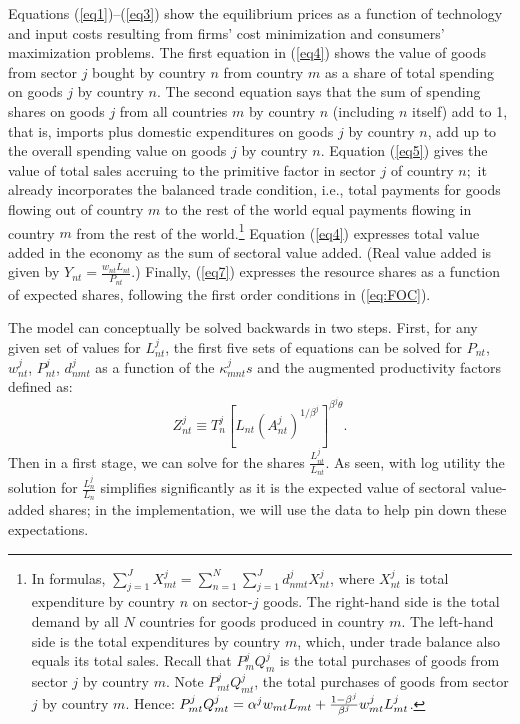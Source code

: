 \documentclass[12pt]{article}
\begin{document}
Equations (\ref{eq1})--(\ref{eq3}) show the equilibrium prices as a function
of technology and input costs resulting from firms' cost minimization and
consumers' maximization problems. The first equation in (\ref{eq4}) shows
the value of goods from sector $j$ bought by country $n$ from country $m$ as
a share of total spending on goods $j$ by country $n.$ The second equation
says that the sum of spending shares on goods $j$ from all countries $m$ by
country $n$ (including $n$ itself) add to 1, that is, imports plus domestic
expenditures on goods $j$ by country $n$, add up to the overall spending
value on goods $j$ by country $n.$ Equation (\ref{eq5}) gives the value of
total sales accruing to the primitive factor in sector $j$ of country $n;$
it already incorporates the balanced trade condition, i.e., total payments
for goods flowing out of country $m$ to the rest of the world equal payments
flowing in country $m$ from the rest of the world.\footnote{%
In formulas, $\sum\nolimits_{j=1}^{J}X_{mt}^{j}=\sum\nolimits_{n=1}^{N}\sum%
\nolimits_{j=1}^{J}d_{nmt}^{j}X_{nt}^{j}$, where $X_{nt}^{j}$ is total
expenditure by country $n$ on sector-$j$ goods. The right-hand side is the
total demand by all $N$ countries for goods produced in country $m$. The
left-hand side is the total expenditures by country $m$, which, under trade
balance also equals its total sales. Recall that $P_{m}^{j}Q_{m}^{j}$ is the
total purchases of goods from sector $j$ by country $m.$ Note $%
P_{mt}^{j}Q_{mt}^{j}$, the total purchases of goods from sector $j$ by
country $m.$ Hence: $P_{mt}^{j}Q_{mt}^{j}=\alpha ^{j}w_{mt}L_{mt}+\frac{%
1-\beta ^{j}}{\beta ^{j}}w_{mt}^{j}L_{mt}^{j}$.} Equation (\ref{eq4})
expresses total value added in the economy as the sum of sectoral value
added. (Real value added is given by $Y_{nt}=\frac{w_{nt}L_{nt}}{P_{nt}}$.)
Finally, (\ref{eq7}) expresses the resource shares as a function of expected
shares, following the first order conditions in (\ref{eq:FOC}).

The model can conceptually be solved backwards in two steps. First, for any
given set of values for $L_{nt}^{j}$, the first five sets of equations can
be solved for $P_{nt}$, $w_{nt}^{j}$, $P_{nt}^{j}$, $d_{nmt}^{j}$ as a
function of the $\kappa _{mnt}^{j}s$ and the augmented productivity factors
defined as: 
\begin{equation}
Z_{nt}^{j}\equiv T_{n}^{j}\left[ L_{nt}\left( A_{nt}^{j}\right) ^{1/\beta
^{j}}\right] ^{\beta ^{j}\theta }.  \label{productivityfactor}
\end{equation}%
Then in a first stage, we can solve for the shares $\frac{L_{nt}^{j}}{L_{nt}}
$. As seen, with log utility the solution for $\frac{L_{n}^{j}}{L_{n}}$
simplifies significantly as it is the expected value of sectoral value-added
shares; in the implementation, we will use the data to help pin down these
expectations.
\end{document}
